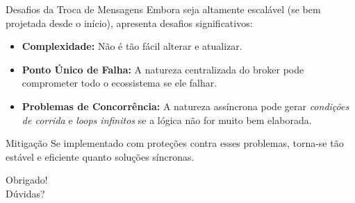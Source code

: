 \documentclass[aspectratio=169]{beamer}
\begin{document}
\begin{frame}{Desafios da Troca de Mensagens}
    Embora seja altamente escalável (se bem projetada desde o início), apresenta desafios significativos:
    \vspace{0.3cm}
    \begin{itemize}
        \item \textbf{Complexidade:} Não é tão fácil alterar e atualizar.
        \item \textbf{Ponto Único de Falha:} A natureza centralizada do broker pode comprometer todo o ecossistema se ele falhar.
        \item \textbf{Problemas de Concorrência:} A natureza assíncrona pode gerar \textit{condições de corrida} e \textit{loops infinitos} se a lógica não for muito bem elaborada.
    \end{itemize}
    \vspace{0.3cm}
    \begin{alertblock}{Mitigação}
        Se implementado com proteções contra esses problemas, torna-se tão estável e eficiente quanto soluções síncronas.
    \end{alertblock}
\end{frame}

\begin{frame}
  \centering
  \Huge Obrigado!\\
  \vspace{1cm}
  \large Dúvidas?
\end{frame}

\end{document}
